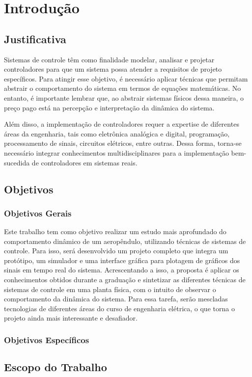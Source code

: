 
\chapter{Introdução}
\label{ch:intro}

\section{Justificativa}

Sistemas de controle têm como finalidade modelar, analisar e projetar controladores para que um sistema possa atender a requisitos de projeto específicos. Para atingir esse objetivo, é necessário aplicar técnicas que permitam abstrair o comportamento do sistema em termos de equações matemáticas. No entanto, é importante lembrar que, ao abstrair sistemas físicos dessa maneira, o preço pago está na percepção e interpretação da dinâmica do sistema.

Além disso, a implementação de controladores requer a expertise de diferentes áreas da engenharia, tais como eletrônica analógica e digital, programação, processamento de sinais, circuitos elétricos, entre outras. Dessa forma, torna-se necessário integrar conhecimentos multidisciplinares para a implementação bem-sucedida de controladores em sistemas reais.



\section{Objetivos}

\subsection{Objetivos Gerais}

Este trabalho tem como objetivo realizar um estudo mais aprofundado do comportamento dinâmico de um aeropêndulo, utilizando técnicas de sistemas de controle. Para isso, será desenvolvido um projeto completo que integra um protótipo, um simulador e uma interface gráfica para plotagem de gráficos dos sinais em tempo real do sistema. Acrescentando a isso, a proposta é aplicar os conhecimentos obtidos durante a graduação e sintetizar as diferentes técnicas de sistemas de controle em uma planta física, com o intuito de observar o comportamento da dinâmica do sistema. Para essa tarefa, serão mescladas tecnologias de diferentes áreas do curso de engenharia elétrica, o que torna o projeto ainda mais interessante e desafiador.



\subsection{Objetivos Específicos}

\section{Escopo do Trabalho}